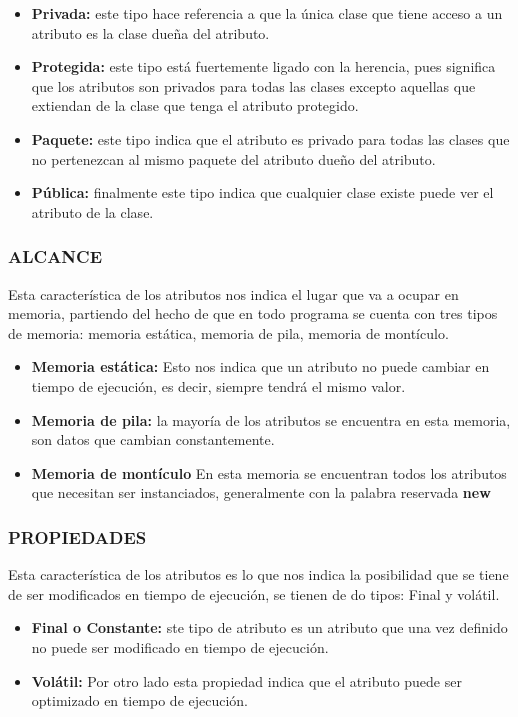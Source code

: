 \begin{itemize}
	\item{\textbf{Privada:} este tipo hace referencia a que la única clase que tiene acceso a un atributo es la clase dueña del atributo.}
	\item{\textbf{Protegida:} este tipo está fuertemente ligado con la herencia, pues significa que los atributos son privados para todas las clases excepto aquellas que extiendan de la clase que tenga el atributo protegido.}
	\item{\textbf{Paquete:} este tipo indica que el atributo es privado para todas las clases que no pertenezcan al mismo paquete del atributo dueño del atributo. 	}
	\item{\textbf{Pública:} finalmente este tipo indica que cualquier clase existe puede ver el atributo de la clase.}
\end{itemize}

\subsubsection*{ALCANCE}
Esta característica de los atributos nos indica el lugar que va a ocupar en memoria, partiendo del hecho de que en todo programa se cuenta con tres tipos de memoria: memoria estática, memoria de pila, memoria de montículo.

\begin{itemize}
	\item{\textbf{Memoria estática:} Esto nos indica que un atributo no puede cambiar en tiempo de ejecución, es decir, siempre tendrá el mismo valor.}
	\item{\textbf{Memoria de pila:} la mayoría de los atributos se encuentra en esta memoria, son datos que cambian constantemente.}
	\item{\textbf{Memoria de montículo} En esta memoria se encuentran todos los atributos que necesitan ser instanciados, generalmente con la palabra reservada \textbf{new}}
	
\end{itemize}

\subsubsection*{PROPIEDADES}
Esta característica de los atributos es lo que nos indica la posibilidad que se tiene de ser modificados en tiempo de ejecución, se tienen de do tipos: Final y volátil.

\begin{itemize}
	\item{\textbf{Final o Constante:} ste tipo de atributo es un atributo que una vez definido no puede ser modificado en tiempo de ejecución.}
	\item{\textbf{Volátil:} Por otro lado esta propiedad indica que el atributo puede ser optimizado en tiempo de ejecución.}
\end{itemize}

